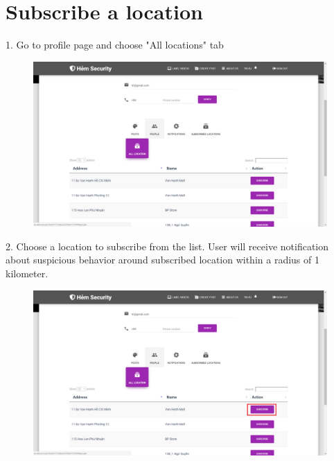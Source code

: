\section{Subscribe a location}
1. Go to profile page and choose "All locations" tab
\begin{center}
    \begin{figure}[H]
    \centering
    \includegraphics[width=1\columnwidth]{images/chap6/instruction9.png}
    \end{figure}
\end{center}
2. Choose a location to subscribe from the list. User will receive notification about suspicious behavior around subscribed location within a radius of 1 kilometer.   
\begin{center}
    \begin{figure}[H]
    \centering
    \includegraphics[width=1\columnwidth]{images/chap6/instruction10.png}
    \end{figure}
\end{center}

